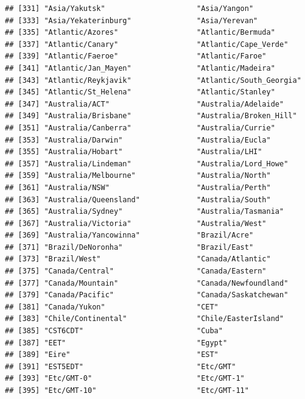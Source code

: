 \documentclass[
]{book}
\begin{document}
\begin{verbatim}
## [331] "Asia/Yakutsk"                     "Asia/Yangon"                     
## [333] "Asia/Yekaterinburg"               "Asia/Yerevan"                    
## [335] "Atlantic/Azores"                  "Atlantic/Bermuda"                
## [337] "Atlantic/Canary"                  "Atlantic/Cape_Verde"             
## [339] "Atlantic/Faeroe"                  "Atlantic/Faroe"                  
## [341] "Atlantic/Jan_Mayen"               "Atlantic/Madeira"                
## [343] "Atlantic/Reykjavik"               "Atlantic/South_Georgia"          
## [345] "Atlantic/St_Helena"               "Atlantic/Stanley"                
## [347] "Australia/ACT"                    "Australia/Adelaide"              
## [349] "Australia/Brisbane"               "Australia/Broken_Hill"           
## [351] "Australia/Canberra"               "Australia/Currie"                
## [353] "Australia/Darwin"                 "Australia/Eucla"                 
## [355] "Australia/Hobart"                 "Australia/LHI"                   
## [357] "Australia/Lindeman"               "Australia/Lord_Howe"             
## [359] "Australia/Melbourne"              "Australia/North"                 
## [361] "Australia/NSW"                    "Australia/Perth"                 
## [363] "Australia/Queensland"             "Australia/South"                 
## [365] "Australia/Sydney"                 "Australia/Tasmania"              
## [367] "Australia/Victoria"               "Australia/West"                  
## [369] "Australia/Yancowinna"             "Brazil/Acre"                     
## [371] "Brazil/DeNoronha"                 "Brazil/East"                     
## [373] "Brazil/West"                      "Canada/Atlantic"                 
## [375] "Canada/Central"                   "Canada/Eastern"                  
## [377] "Canada/Mountain"                  "Canada/Newfoundland"             
## [379] "Canada/Pacific"                   "Canada/Saskatchewan"             
## [381] "Canada/Yukon"                     "CET"                             
## [383] "Chile/Continental"                "Chile/EasterIsland"              
## [385] "CST6CDT"                          "Cuba"                            
## [387] "EET"                              "Egypt"                           
## [389] "Eire"                             "EST"                             
## [391] "EST5EDT"                          "Etc/GMT"                         
## [393] "Etc/GMT-0"                        "Etc/GMT-1"                       
## [395] "Etc/GMT-10"                       "Etc/GMT-11"                      

\end{verbatim}
\end{document}
